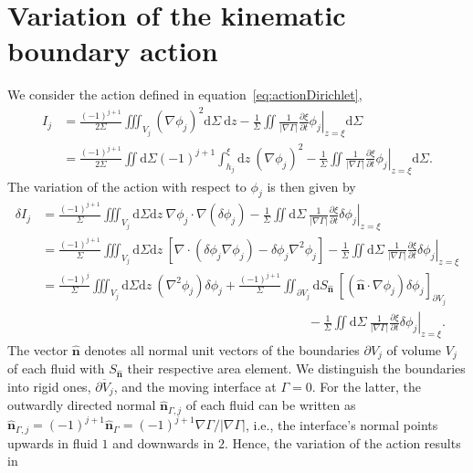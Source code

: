 \documentclass[a4paper]{jpconf}
\newcommand{\unvec}[1]{\bm{\hat{#1}}}
\newcommand{\dd}{\mathrm{d}}
\begin{document}
\section{Variation of the kinematic boundary action}
\label{app:variationAction}
We consider the action defined in equation~\eqref{eq:actionDirichlet},
\begin{equation}
\begin{aligned}    
    I_j &= \frac{(-1)^{j+1}}{2\Sigma}\iiint_{V_j} \left(\nabla\phi_j\right)^2 \dd\Sigma~\dd z
    -\frac{1}{\Sigma}\iint \frac{1}{|\nabla\Gamma|}\frac{\partial\xi}{\partial t}\left.\phi_j\right|_{z=\xi} \dd\Sigma\\
    &=\frac{(-1)^{j+1}}{2\Sigma}\iint\dd\Sigma(-1)^{j+1}\int_{h_j}^{\xi}\dd z~\left(\nabla\phi_j\right)^2-\frac{1}{\Sigma}\iint \frac{1}{|\nabla\Gamma|}\frac{\partial\xi}{\partial t}\left.\phi_j\right|_{z=\xi} \dd\Sigma.
\end{aligned}
\end{equation}
The variation of the action with respect to $\phi_j$ is then given by
\begin{equation}
\begin{aligned}    
    \delta I_j &= \frac{(-1)^{j+1}}{\Sigma}\iiint_{V_j}\dd\Sigma\dd z ~\nabla\phi_j\cdot\nabla(\delta\phi_j)-\frac{1}{\Sigma}\iint\dd\Sigma~\frac{1}{|\nabla\Gamma|}\frac{\partial\xi}{\partial t}\left.\delta\phi_j\right|_{z=\xi}\\
    &=\frac{(-1)^{j+1}}{\Sigma}\iiint_{V_j}\dd\Sigma\dd z~\left[\nabla\cdot\left(\delta\phi_j\nabla\phi_j\right)-\delta\phi_j\nabla^2\phi_j\right]
    -\frac{1}{\Sigma}\iint\dd\Sigma~\frac{1}{|\nabla\Gamma|}\frac{\partial\xi}{\partial t}\left.\delta\phi_j\right|_{z=\xi}\\
    &=\frac{(-1)^{j}}{\Sigma}\iiint_{V_j}\dd\Sigma\dd z~\left(\nabla^2\phi_j\right)\delta\phi_j
    +\frac{(-1)^{j+1}}{\Sigma}\iint_{\partial V_j}\dd S_{\unvec{n}}~\left[\left(\unvec{n}\cdot\nabla\phi_j\right)\delta\phi_j\right]_{\partial V_j}\\
    &\hspace{250pt}-\frac{1}{\Sigma}\iint\dd\Sigma~\frac{1}{|\nabla\Gamma|}\frac{\partial\xi}{\partial t}\left.\delta\phi_j\right|_{z=\xi}.
\end{aligned}
\end{equation}
The vector $\unvec{n}$ denotes all normal unit vectors of the boundaries $\partial V_j$ of volume $V_j$ of each fluid with $S_{\unvec{n}}$ their respective area element. We distinguish the boundaries into rigid ones, $\overline{\partial V_j}$, and the moving interface at $\Gamma=0$. For the latter, the outwardly directed normal $\unvec{n}_{\Gamma,j}$ of each fluid can be written as $\unvec{n}_{\Gamma,j}=(-1)^{j+1}\unvec{n}_\Gamma=(-1)^{j+1}\nabla\Gamma/|\nabla\Gamma|$, i.e., the interface's normal points upwards in fluid $1$ and downwards in $2$. Hence, the variation of the action results in
\end{document}
